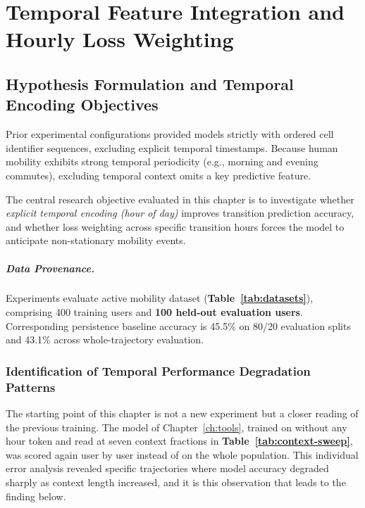 \chapter{Temporal Feature Integration and Hourly Loss Weighting}
\label{ch:time}

\section{Hypothesis Formulation and Temporal Encoding Objectives}

Prior experimental configurations provided models strictly with ordered cell identifier sequences, excluding explicit temporal timestamps. Because human mobility exhibits strong temporal periodicity (e.g., morning and evening commutes), excluding temporal context omits a key predictive feature.

The central research objective evaluated in this chapter is to investigate whether \emph{explicit temporal encoding (hour of day)} improves transition prediction accuracy, and whether loss weighting across specific transition hours forces the model to anticipate non-stationary mobility events.

\paragraph{Data Provenance.} Experiments evaluate active mobility dataset \Dmob{} (\textbf{Table~\ref{tab:datasets}}), comprising 400 training users and \textbf{100 held-out evaluation users}. Corresponding persistence baseline accuracy is 45.5\% on 80/20 evaluation splits and 43.1\% across whole-trajectory evaluation.

\subsection{Identification of Temporal Performance Degradation Patterns}

The starting point of this chapter is not a new experiment but a closer reading of the previous training. The model of Chapter~\ref{ch:tools}, trained on \Dmob{} without any hour token and read at seven context fractions in \textbf{Table~\ref{tab:context-sweep}}, was scored again user by user instead of on the whole population. This individual error analysis revealed specific trajectories where model accuracy degraded sharply as context length increased, and it is this observation that leads to the finding below.

